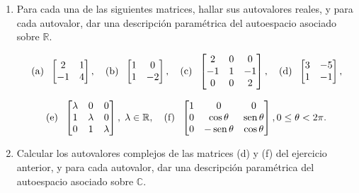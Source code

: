 \begin{enumerate}[topsep=6pt,itemsep=.4cm]


\item\label{autovalores} Para cada una de las siguientes matrices, hallar sus autovalores reales, y para cada autovalor, dar una descripción paramétrica del autoespacio asociado sobre $\mathbb{R}$.

$$
\textrm{(a)\; } \left[\begin{matrix} 2 & 1\\ -1 & 4 \end{matrix} \right],
\quad
\textrm{(b)\; }
\left[\begin{matrix} 1 & 0\\ 1 & -2 \end{matrix} \right],
\quad \textrm{(c)\; } \left[\begin{matrix}2 & 0 & 0\\ -1 & 1& -1\\ 0 & 0 & 2 \end{matrix} \right] ,\quad
\textrm{(d)\; } \begin{bmatrix} 3 & -5 \\ 1 & -1 \end{bmatrix},
$$

$$
\textrm{(e)\; } \begin{bmatrix} \lambda & 0 & 0 \\ 1 & \lambda & 0\\ 0 & 1 & \lambda \\ \end{bmatrix}, \; \lambda\in \mathbb R,\quad
\textrm{(f)\; } \left[\begin{matrix}1 & 0& 0 \\ 0 & \cos\theta & \operatorname{sen}\theta\\ 0 & -\operatorname{sen}\theta & \cos\theta \end{matrix} \right], 0\leq \theta<2\pi.
$$ 


\item\label{autovalores-complejos} Calcular los autovalores complejos de las matrices (d) y (f) del ejercicio anterior, y para cada autovalor, dar una descripción paramétrica del autoespacio asociado sobre $\mathbb{C}$.
\end{enumerate}

